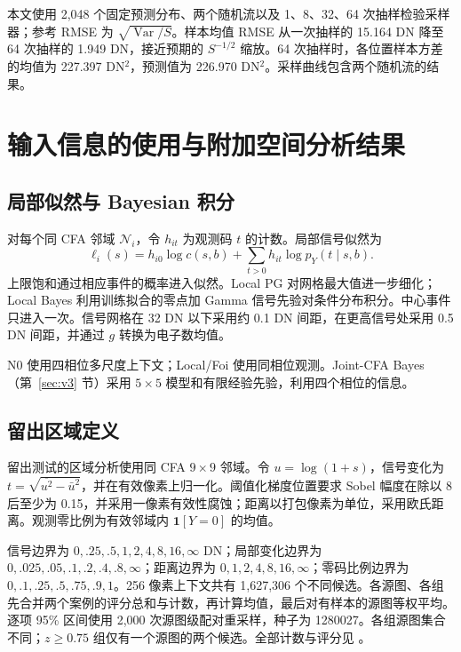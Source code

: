 \documentclass[10pt,twocolumn,journal]{IEEEtran}
\begin{document}
本文使用 2,048 个固定预测分布、两个随机流以及 1、8、32、64 次抽样检验采样器；参考 RMSE 为 $\sqrt{\operatorname{Var}/S}$。样本均值 RMSE 从一次抽样的 15.164 DN 降至 64 次抽样的 1.949 DN，接近预期的 $S^{-1/2}$ 缩放。64 次抽样时，各位置样本方差的均值为 227.397 DN$^2$，预测值为 226.970 DN$^2$。采样曲线包含两个随机流的结果。



\section{输入信息的使用与附加空间分析结果}
\subsection{局部似然与 Bayesian 积分}
对每个同 CFA 邻域 $\mathcal N_i$，令 $h_{it}$ 为观测码 $t$ 的计数。局部信号似然为
\begin{equation}
\ell_i(s)=h_{i0}\log c(s,b)+\sum_{t>0}h_{it}\log p_Y(t\mid s,b).
\end{equation}
上限饱和通过相应事件的概率进入似然。Local PG 对网格最大值进一步细化；Local Bayes 利用训练拟合的零点加 Gamma 信号先验对条件分布积分。中心事件只进入一次。信号网格在 32 DN 以下采用约 0.1 DN 间距，在更高信号处采用 0.5 DN 间距，并通过 $g$ 转换为电子数均值。

N0 使用四相位多尺度上下文；Local/Foi 使用同相位观测。Joint-CFA Bayes（第~\ref{sec:v3} 节）采用 $5\times5$ 模型和有限经验先验，利用四个相位的信息。

\subsection{留出区域定义}\label{sec:regionaldefinitions}
留出测试的区域分析使用同 CFA $9\times9$ 邻域。令 $u=\log(1+s)$，信号变化为 $t=\sqrt{\overline{u^2}-\bar u^2}$，并在有效像素上归一化。阈值化梯度位置要求 Sobel 幅度在除以 8 后至少为 0.15，并采用一像素有效性腐蚀；距离以打包像素为单位，采用欧氏距离。观测零比例为有效邻域内 $\mathbf1[Y=0]$ 的均值。

信号边界为 $0,.25,.5,1,2,4,8,16,\infty$ DN；局部变化边界为 $0,.025,.05,.1,.2,.4,.8,\infty$；距离边界为 $0,1,2,4,8,16,\infty$；零码比例边界为 $0,.1,.25,.5,.75,.9,1$。256 像素上下文共有 1,627,306 个不同候选。各源图、各组先合并两个案例的评分总和与计数，再计算均值，最后对有样本的源图等权平均。逐项 95\% 区间使用 2,000 次源图级配对重采样，种子为 1280027。各组源图集合不同；$z\geq0.75$ 组仅有一个源图的两个候选。全部计数与评分见 。
\end{document}
